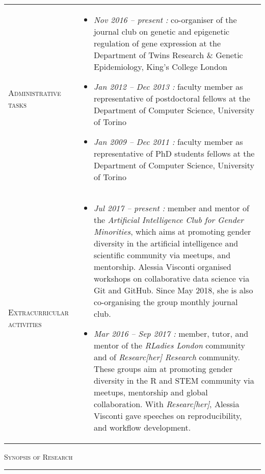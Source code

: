 \documentclass[a4paper,10pt]{article}
\newcommand{\mediumtitle}[1]{
	\vspace{0.2cm}
	{\noindent
	\Large \textsc{#1}\\[-2ex]
	\hrule
	\vspace{0.2cm}}
}
\newenvironment{doubletablelist}
{
	\vspace{-0.2cm}
	\begin{longtable}[!h]{AB}}{\end{longtable}
}
\newcommand{\dtlist}[2]{
\hspace{-3cm}
\noindent
	\begin{minipage}{0.24\textwidth}
	\begin{flushright}
	\textsc{#1}
	\end{flushright}
	\end{minipage}
	& #2\\[0.2cm]
}
\newcommand{\minusitem}{\item[-]}
\begin{document}
\begin{doubletablelist}

\dtlist{Administrative tasks}{
	\vspace{-0.6cm}
	\begin{itemize}[itemsep=-0.5ex]
		\minusitem  \emph{Nov 2016 -- present : } co-organiser of the journal club on genetic and epigenetic regulation of gene expression at the Department of Twins Research \& Genetic Epidemiology, King's College London
		\minusitem  \emph{Jan 2012 -- Dec 2013 : } faculty member as representative of postdoctoral fellows at the Department of Computer Science, University of Torino
		\minusitem  \emph{Jan 2009 -- Dec 2011 : } faculty member as representative of PhD students fellows at the Department of Computer Science, University of Torino
	\end{itemize}
}


\dtlist{Extracurricular activities}{
	\vspace{-0.9cm}
	\begin{itemize}[itemsep=-0.5ex]
		\minusitem \emph{Jul 2017 -- present : } member and mentor of the \emph{Artificial Intelligence Club for Gender Minorities}, which aims at promoting gender diversity in the artificial intelligence and scientific community via meetups, and mentorship. Alessia Visconti organised workshops on collaborative data science via Git and GitHub. Since May 2018, she is also co-organising the group monthly journal club.
		\minusitem  \emph{Mar 2016 -- Sep 2017 : } member, tutor, and mentor of the \emph{RLadies London} community and of \emph{Researc[her] Research} community. These groups aim at promoting gender diversity in the R and STEM community via meetups, mentorship and global collaboration. With \emph{Researc[her]}, Alessia Visconti gave speeches on reproducibility, and workflow development.
	\end{itemize}
}


\end{doubletablelist}

\newpage


\mediumtitle{Synopsis of Research}
\end{document}
